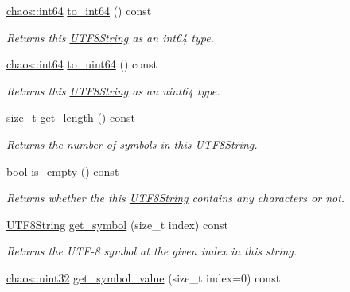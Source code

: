 \begin{DoxyCompactItemize}
\hyperlink{namespacechaos_aa4cfe70894188e01134a2694db2eb2db}{chaos\-::int64} \hyperlink{classchaos_1_1uni_1_1_u_t_f8_string_ac9db9e86ffa8572ba7ecf576d764d89f}{to\-\_\-int64} () const 
\begin{DoxyCompactList}\small\item\em Returns this \hyperlink{classchaos_1_1uni_1_1_u_t_f8_string}{U\-T\-F8\-String} as an int64 type. \end{DoxyCompactList}\item 
\hyperlink{namespacechaos_aa4cfe70894188e01134a2694db2eb2db}{chaos\-::int64} \hyperlink{classchaos_1_1uni_1_1_u_t_f8_string_afe8cb74c9fef1767790a33af2179a0b4}{to\-\_\-uint64} () const 
\begin{DoxyCompactList}\small\item\em Returns this \hyperlink{classchaos_1_1uni_1_1_u_t_f8_string}{U\-T\-F8\-String} as an uint64 type. \end{DoxyCompactList}\item 
size\-\_\-t \hyperlink{classchaos_1_1uni_1_1_u_t_f8_string_a25fc75f62483131e35860598f70c96d8}{get\-\_\-length} () const 
\begin{DoxyCompactList}\small\item\em Returns the number of symbols in this \hyperlink{classchaos_1_1uni_1_1_u_t_f8_string}{U\-T\-F8\-String}. \end{DoxyCompactList}\item 
bool \hyperlink{classchaos_1_1uni_1_1_u_t_f8_string_ad99ed42fcbd51651e6d626bab469af59}{is\-\_\-empty} () const 
\begin{DoxyCompactList}\small\item\em Returns whether the this \hyperlink{classchaos_1_1uni_1_1_u_t_f8_string}{U\-T\-F8\-String} contains any characters or not. \end{DoxyCompactList}\item 
\hyperlink{classchaos_1_1uni_1_1_u_t_f8_string}{U\-T\-F8\-String} \hyperlink{classchaos_1_1uni_1_1_u_t_f8_string_a32e14ce1bc404c36fe73741088daaaef}{get\-\_\-symbol} (size\-\_\-t index) const 
\begin{DoxyCompactList}\small\item\em Returns the U\-T\-F-\/8 symbol at the given index in this string. \end{DoxyCompactList}\item 
\hyperlink{namespacechaos_a8641b3ae4551f0b35570d4f9f4ec22d9}{chaos\-::uint32} \hyperlink{classchaos_1_1uni_1_1_u_t_f8_string_a0de9e9c20e4aa5f76daf752788db2039}{get\-\_\-symbol\-\_\-value} (size\-\_\-t index=0) const 

\end{DoxyCompactItemize}
